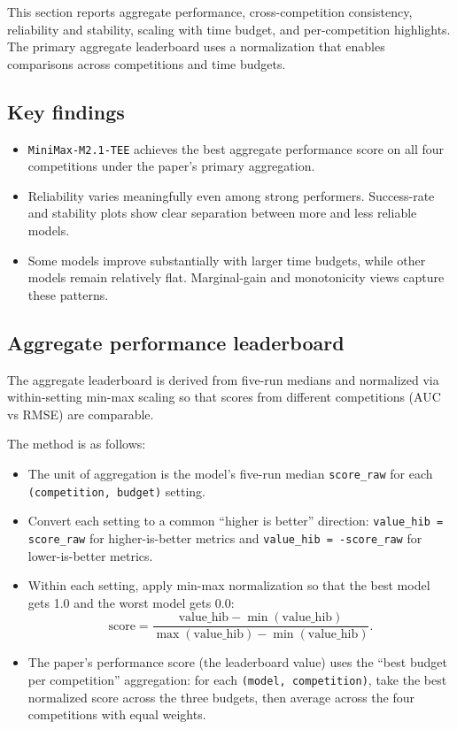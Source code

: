 This section reports aggregate performance, cross-competition consistency, reliability and stability, scaling with time budget, and per-competition highlights. The primary aggregate leaderboard uses a normalization that enables comparisons across competitions and time budgets.

\subsection{Key findings}
\begin{itemize}
  \item \texttt{MiniMax-M2.1-TEE} achieves the best aggregate performance score on all four competitions under the paper's primary aggregation.
  \item Reliability varies meaningfully even among strong performers. Success-rate and stability plots show clear separation between more and less reliable models.
  \item Some models improve substantially with larger time budgets, while other models remain relatively flat. Marginal-gain and monotonicity views capture these patterns.
\end{itemize}

\subsection{Aggregate performance leaderboard}
The aggregate leaderboard is derived from five-run medians and normalized via within-setting min-max scaling so that scores from different competitions (AUC vs RMSE) are comparable.

The method is as follows:
\begin{itemize}
  \item The unit of aggregation is the model's five-run median \texttt{score\_raw} for each \texttt{(competition, budget)} setting.
  \item Convert each setting to a common ``higher is better'' direction: \texttt{value\_hib = score\_raw} for higher-is-better metrics and \texttt{value\_hib = -score\_raw} for lower-is-better metrics.
  \item Within each setting, apply min-max normalization so that the best model gets 1.0 and the worst model gets 0.0:
    \[
      \mathrm{score} = \frac{\mathrm{value\_hib} - \min(\mathrm{value\_hib})}{\max(\mathrm{value\_hib}) - \min(\mathrm{value\_hib})}.
    \]
  \item The paper's performance score (the leaderboard value) uses the ``best budget per competition'' aggregation: for each \texttt{(model, competition)}, take the best normalized score across the three budgets, then average across the four competitions with equal weights.
\end{itemize}

